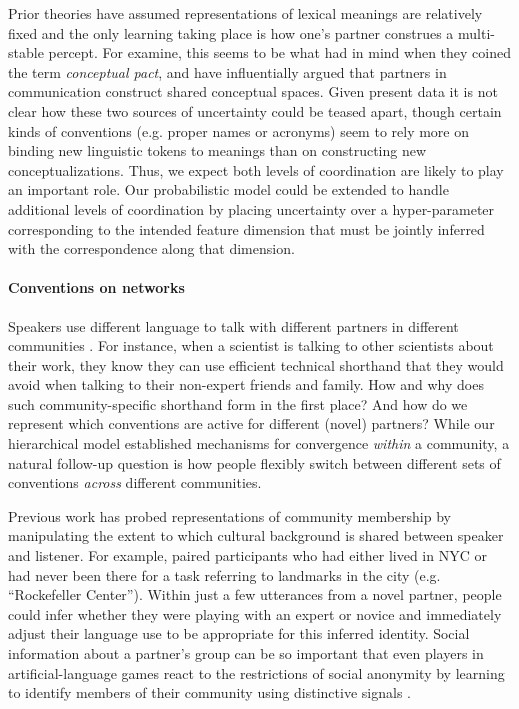 Prior theories have assumed representations of lexical meanings are relatively fixed and the only learning taking place is how one's partner construes a multi-stable percept. 
For examine, this seems to be what  had in mind when they coined the term \emph{conceptual pact}, and \cite{stolk2016conceptual} have influentially argued that partners in communication construct shared conceptual spaces. 
Given present data it is not clear how these two sources of uncertainty could be teased apart, though certain kinds of conventions (e.g. proper names or acronyms) seem to rely more on binding new linguistic tokens to meanings than on constructing new conceptualizations.
Thus, we expect both levels of coordination are likely to play an important role. 
Our probabilistic model could be extended to handle additional levels of coordination by placing uncertainty over a hyper-parameter corresponding to the intended feature dimension that must be jointly inferred with the correspondence along that dimension. 

\paragraph{Conventions on networks}

Speakers use different language to talk with different partners in different communities \cite{auer_code-switching_2013}. 
For instance, when a scientist is talking to other scientists about their work, they know they can use efficient technical shorthand that they would avoid when talking to their non-expert friends and family. 
How and why does such community-specific shorthand form in the first place? 
And how do we represent which conventions are active for different (novel) partners? 
While our hierarchical model established mechanisms for convergence \emph{within} a community, a natural follow-up question is how people flexibly switch between different sets of conventions \emph{across} different communities.

Previous work has probed representations of community membership by manipulating the extent to which cultural background is shared between speaker and listener.
For example,  paired participants who had either lived in NYC or had never been there for a task referring to landmarks in the city (e.g. ``Rockefeller Center''). 
Within just a few utterances from a novel partner, people could infer whether they were playing with an expert or novice and immediately adjust their language use to be appropriate for this inferred identity. 
Social information about a partner’s group can be so important that even players in artificial-language games react to the restrictions of social anonymity by learning to identify members of their community using distinctive signals \cite{roberts_experimental_2010}.

